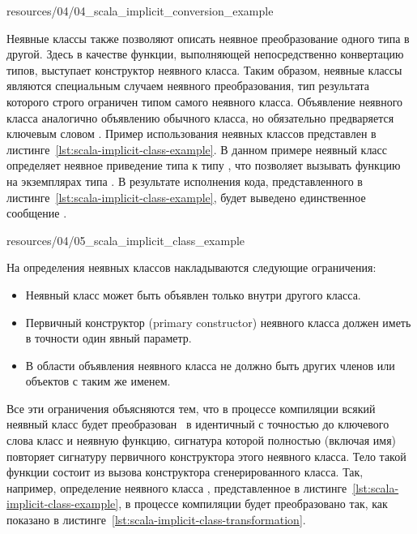 
{resources/04/04_scala_implicit_conversion_example}

Неявные классы также позволяют описать неявное преобразование одного типа в другой. Здесь в качестве функции, выполняющей непосредственно конвертацию типов, выступает конструктор неявного класса. Таким образом, неявные классы являются специальным случаем неявного преобразования, тип результата которого строго ограничен типом самого неявного класса. Объявление неявного класса аналогично объявлению обычного класса, но обязательно предваряется ключевым словом . Пример использования неявных классов представлен в листинге~\ref{lst:scala-implicit-class-example}. В данном примере неявный класс  определяет неявное приведение типа  к типу , что позволяет вызывать функцию  на экземплярах типа . В результате исполнения кода, представленного в листинге~\ref{lst:scala-implicit-class-example}, будет выведено единственное сообщение .


{resources/04/05_scala_implicit_class_example}

На определения неявных классов накладываются следующие ограничения:
\begin{itemize}
	\item Неявный класс может быть объявлен только внутри другого класса.
	\item Первичный конструктор (primary constructor) неявного класса должен иметь в точности один явный параметр.
	\item В области объявления неявного класса не должно быть других членов или объектов с таким же именем.
\end{itemize}
Все эти ограничения объясняются тем, что в процессе компиляции всякий неявный класс будет преобразован~\cite{sip-13} в идентичный с точностью до ключевого слова  класс и неявную функцию, сигнатура которой полностью (включая имя) повторяет сигнатуру первичного конструктора этого неявного класса. Тело такой функции состоит из вызова конструктора сгенерированного класса. Так, например, определение неявного класса , представленное в листинге~\ref{lst:scala-implicit-class-example}, в процессе компиляции будет преобразовано так, как показано в листинге~\ref{lst:scala-implicit-class-transformation}.

